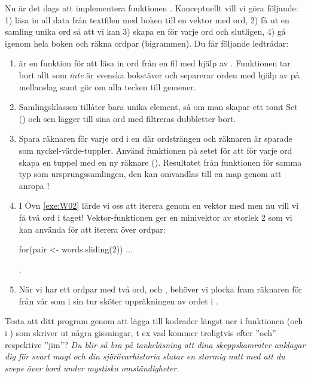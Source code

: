 \Subtask Nu är det dags att implementera funktionen . Konceptuellt vill vi göra följande: 1) läsa in all data från textfilen med boken till en vektor med ord, 2) få ut en samling unika ord så att vi kan 3) skapa en  för varje ord och slutligen, 4) gå igenom hela boken och räkna ordpar (bigrammen).  
\noindent
Du får följande ledtrådar: 

\begin{enumerate}
\item {} är en funktion för att läsa in ord från en fil med hjälp av . Funktionen tar bort allt som {\em inte} är svenska bokstäver och separerar orden med hjälp av  på mellanslag samt gör om alla tecken till gemener. 

\item Samlingsklassen  tillåter bara unika element, så om man skapar ett tomt Set () och sen lägger till sina ord med \code{++}  filtreras dubbletter bort. 

\item Spara räknaren för varje ord i en  där ordsträngen och räknaren är sparade som nyckel-värde-tuppler. Använd funktionen  på setet för att för varje ord  skapa en tuppel med en ny räknare (). Resultatet från funktionen  för samma typ som ursprungssamlingen, den kan omvandlas till en map genom att anropa !

\item I Övn \ref{exe:W02} lärde vi oss att iterera genom en vektor med  men nu vill vi få två ord i taget! Vektor-funktionen  ger en minivektor av storlek 2 som vi kan använda för att iterera över ordpar: 
\begin{Code} 
for(pair <- words.sliding(2)) { ... } 
\end{Code}.

\item När vi har ett ordpar med två ord,  och , behöver vi plocka fram räknaren för  från vår  som i sin tur sköter uppräkningen av ordet  i . 

\end{enumerate}

\Subtask Testa att ditt program genom att lägga till kodrader längst ner i funktionen  (och i ) som skriver ut några gissningar, t ex vad kommer troligtvis efter ''och'' respektive ''jim''? 
\newline
\newline
\noindent
\emph{Du blir så bra på tankeläsning att dina skeppskamrater anklagar dig för svart magi och din sjörövarhistoria slutar en stormig natt med att du sveps över bord under mystiska omständigheter.}


